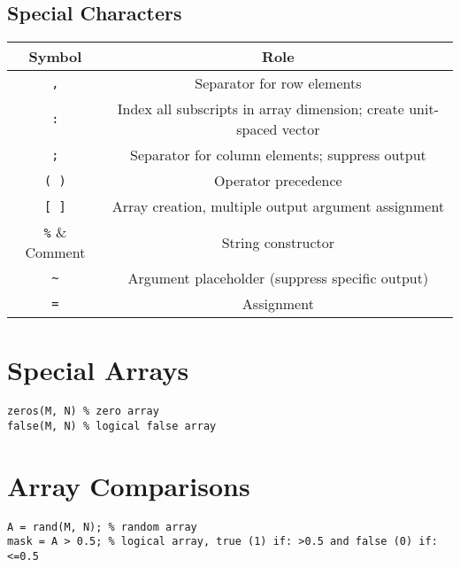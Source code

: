\documentclass{article}
\begin{document}
\subsection*{Special Characters}
\begin{table}[H]
    \centering
    \begin{tabular}{c | c}
        \toprule
        \textbf{Symbol} & \textbf{Role}                                                      \\
        \midrule
        \lstinline!,!   & Separator for row elements                                         \\
        \lstinline!:!   & Index all subscripts in array dimension; create unit-spaced vector \\
        \lstinline!;!   & Separator for column elements; suppress output                     \\
        \lstinline!( )! & Operator precedence                                                \\
        \lstinline![ ]! & Array creation, multiple output argument assignment                \\
        \lstinline!%!   & Comment                                                            \\
        \lstinline!""!  & String constructor                                                 \\
        \lstinline!~!   & Argument placeholder (suppress specific output)                    \\
        \lstinline!=!   & Assignment                                                         \\
        \bottomrule
    \end{tabular}
\end{table}
\section*{Special Arrays}
\begin{lstlisting}
zeros(M, N) % zero array
false(M, N) % logical false array
\end{lstlisting}
\section*{Array Comparisons}
\begin{lstlisting}
A = rand(M, N); % random array
mask = A > 0.5; % logical array, true (1) if: >0.5 and false (0) if: <=0.5
\end{lstlisting}
\end{document}
